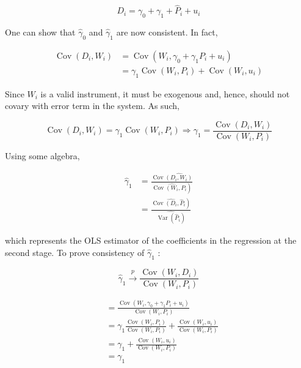 $$
D_{i}=\gamma_{0}+\gamma_{1}+\widehat{P}_{i}+u_{i}
$$

One can show that $\widehat{\gamma}_{0}$ and $\widehat{\gamma}_{1}$ are now consistent. In fact,

$$
\begin{aligned}
\operatorname{Cov}\left(D_{i}, W_{i}\right) & =\operatorname{Cov}\left(W_{i}, \gamma_{0}+\gamma_{1} P_{i}+u_{i}\right) \\
& =\gamma_{1} \operatorname{Cov}\left(W_{i}, P_{i}\right)+\operatorname{Cov}\left(W_{i}, u_{i}\right)
\end{aligned}
$$

Since $W_{i}$ is a valid instrument, it must be exogenous and, hence, should not covary with error term in the system. As such,

$$
\operatorname{Cov}\left(D_{i}, W_{i}\right)=\gamma_{1} \operatorname{Cov}\left(W_{i}, P_{i}\right) \Longrightarrow \gamma_{1}=\frac{\operatorname{Cov}\left(D_{i}, W_{i}\right)}{\operatorname{Cov}\left(W_{i}, P_{i}\right)}
$$

Using some algebra,

$$
\begin{aligned}
\widehat{\gamma}_{1} & =\frac{\operatorname{Cov} \widehat{\left(D_{i}, W_{i}\right)}}{\left.\operatorname{Cov} \widehat{\left(W_{i}\right.}, P_{i}\right)} \\
& =\frac{\left.\operatorname{Cov} \widehat{\left(D_{i}\right.}, \widehat{P}_{i}\right)}{\widehat{\operatorname{Var}\left(\widehat{P}_{i}\right)}}
\end{aligned}
$$

which represents the OLS estimator of the coefficients in the regression at the second stage. To prove consistency of $\widehat{\gamma}_{1}$ :

$$
\widehat{\gamma}_{1} \xrightarrow{p} \frac{\operatorname{Cov}\left(W_{i}, D_{i}\right)}{\operatorname{Cov}\left(W_{i}, P_{i}\right)}
$$

$$
\begin{aligned}
& =\frac{\operatorname{Cov}\left(W_{i}, \gamma_{0}+\gamma_{1} P_{i}+u_{i}\right)}{\operatorname{Cov}\left(W_{i}, P_{i}\right)} \\
& =\gamma_{1} \frac{\operatorname{Cov}\left(W_{i}, P_{i}\right)}{\operatorname{Cov}\left(W_{i}, P_{i}\right)}+\frac{\operatorname{Cov}\left(W_{i}, u_{i}\right)}{\operatorname{Cov}\left(W_{i}, P_{i}\right)} \\
& =\gamma_{1}+\frac{\operatorname{Cov}\left(W_{i}, u_{i}\right)}{\operatorname{Cov}\left(W_{i}, P_{i}\right)} \\
& =\gamma_{1}
\end{aligned}
$$

